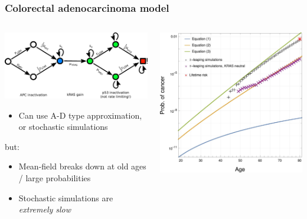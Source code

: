 \documentclass{beamer}
\begin{document}
\begin{frame}
    \frametitle{Colorectal adenocarcinoma model}
    \begin{columns}
        \begin{column}{0.5\textwidth}
        \includegraphics[width=1.0\textwidth]{figures/diagram7}
        \begin{itemize}
            \item Can use A-D type approximation, or stochastic simulations
        \end{itemize}
        but:
        \begin{itemize}
            \item Mean-field breaks down at old ages / large probabilities
            \item Stochastic simulations are \emph{extremely slow}
        \end{itemize}
        \end{column}
        \begin{column}{0.5\textwidth}
        \includegraphics[width=\textwidth]{figures/F2.large.jpg}
        \end{column}
    \end{columns}

\end{frame}
\end{document}

